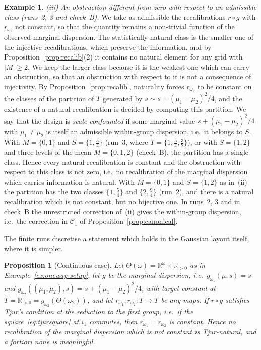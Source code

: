 \documentclass[11pt,a4paper]{article}
\theoremstyle{plain}
\newtheorem{proposition}[theorem]{Proposition}
\theoremstyle{definition}
\newtheorem{example}[theorem]{Example}
\theoremstyle{remark}
\newcommand{\R}{\mathbb{R}}
\begin{document}
\begin{example}
\emph{(iii) An obstruction different from zero with respect to an admissible
class (runs~2, 3 and check~B).} We take as admissible the recalibrations
$r \circ g$ with $r_{\omega_2}$ not constant, so that the quantity remains a
non-trivial function of the observed marginal dispersion. The statistically
natural class is the smaller one of the injective recalibrations, which
preserve the information, and by Proposition~\ref{prop:recalib}(2) it contains
no natural element for any grid with $|M| \ge 2$. We keep the larger class
because it is the weakest one which can carry an obstruction, so that an
obstruction with respect to it is not a consequence of injectivity. By
Proposition~\ref{prop:recalib}, naturality forces $r_{\omega_2}$ to be constant
on the classes of the partition of $T$ generated by
$s \sim s + (\mu_1-\mu_2)^2/4$, and the existence of a natural recalibration is
decided by computing this partition. We say that the design is
\emph{scale-confounded} if some marginal value $s + (\mu_1-\mu_2)^2/4$ with
$\mu_1 \neq \mu_2$ is itself an admissible within-group dispersion, i.e.\ it
belongs to $S$. With $M = \{0,1\}$ and $S = \{1,\tfrac54\}$ (run~3, where
$T = \{1,\tfrac54,\tfrac32\}$), or with $S = \{1,2\}$ and three levels of the
mean $M = \{0,1,2\}$ (check~B), the partition has a single class. Hence every
natural recalibration is constant and the obstruction with respect to this
class is not zero, i.e.\ no recalibration of the marginal dispersion which
carries information is natural. With $M = \{0,1\}$ and $S = \{1,2\}$ as
in~(ii) the partition has the two classes $\{1,\tfrac54\}$ and
$\{2,\tfrac94\}$ (run~2), and there is a natural recalibration which is not
constant, but no bijective one. In runs~2, 3 and in check~B the unrestricted
correction of~(ii) gives the within-group dispersion, i.e.\ the correction in
$\mathcal{C}_{1}$ of Proposition~\ref{prop:canonical}.
\end{example}

The finite runs discretise a statement which holds in the Gaussian layout
itself, where it is simpler.

\begin{proposition}[Continuous case]\label{prop:oneway-cont-recalib}
Let $\Theta(\omega) = \R^{\omega} \times \R_{>0}$ as in
Example~\ref{ex:oneway-setup}, let $g$ be the marginal dispersion, i.e.\
$g_{\omega_1}(\mu,s) = s$ and
$g_{\omega_2}((\mu_1,\mu_2),s) = s + (\mu_1-\mu_2)^{2}/4$, with target constant
at $T = \R_{>0} = g_{\omega_2}(\Theta(\omega_2))$, and let
$r_{\omega_1}, r_{\omega_2} \colon T \to T$ be any maps. If $r \circ g$
satisfies Tjur's condition at the reduction to the first group, i.e.\ if the
square~\eqref{eq:tjursquare} at $i_1$ commutes, then
$r_{\omega_1} = r_{\omega_2}$ is constant. Hence no recalibration of the
marginal dispersion which is not constant is Tjur-natural, and a fortiori none
is meaningful.
\end{proposition}
\end{document}
